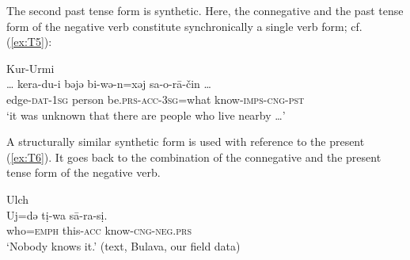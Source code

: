 \documentclass[output=paper,colorlinks,citecolor=brown]{langscibook}
\begin{document}
The second past tense form is synthetic. Here, the connegative and the past tense form of the negative verb constitute synchronically a single verb form; cf. (\ref{ex:T5}):

\ea Kur-Urmi \label{ex:T5}\\
	\gll … kera-du-i	bəjə	bi-wə-n=xəj	{sa-o-rā-čin …}\\
	{} edge-\textsc{dat-1sg}	person	be.\textsc{prs-acc-3sg}=what	know-\textsc{imps-cng-pst} {}\\
	\glt `it was unknown that there are people who live nearby …' \citep[145, text]{sunik1958a}
\z

A structurally similar synthetic form is used with reference to the present (\ref{ex:T6}). It goes back to the combination of the connegative and the present tense form of the negative verb.

\ea Ulch \label{ex:T6}\\
	\gll Uj=də	tị-wa	sā-ra-sị.\\
	who=\textsc{emph}	this-\textsc{acc}	know-\textsc{cng-neg.prs}\\
	\glt `Nobody knows it.' (text, Bulava, our field data)
\z
\end{document}
